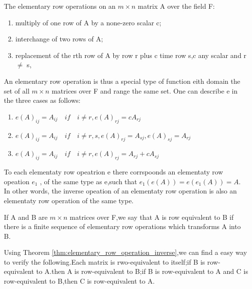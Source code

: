 The elementary row operations on an $m \times n$ matrix A over the field F:
\begin{enumerate}
	\item multiply of one row of A by a none-zero scalar c;
	\item interchange of two rows of A;
	\item replacement of the rth row of A by row r plus c time row s,c any scalar and r $\neq$ s,
\end{enumerate}

An elementary row operation is thus a special type of function eith domain the set of all $m \times n$ matrices over F and range the same set.
One can describe e in the three cases as follows:
\begin{enumerate}
	\item $e(A)_{ij} = A_{ij} \quad if \quad  i \neq r ,e(A)_{rj} = cA_{rj}$
	\item $e(A)_{ij} = A_{ij} \quad if \quad  i \neq r,s ,e(A)_{rj} = A_{sj},e(A)_{sj} = A_{rj}$
	\item $e(A)_{ij} = A_{ij} \quad if \quad  i \neq r ,e(A)_{rj} = A_{rj}+cA_{sj}$
	      \label{eq:elementary_row_operations describe}
\end{enumerate}

\begin{theorem}
	To each elementaty row opeatrion e there corrspoonds an elementaty row opeation $e_1$ , of the
	same type as e,such that $e_1(e(A)) = e(e_1(A)) = A$. In other words, the inverse opeation  of an elementaty row operation is also an elementaty row operation of the same type.
	\label{thm:elementary_row_operation_inverse}
\end{theorem}

\begin{definition}
	If A and B are $m \times n$ matrices over F,we say that A is row equivalent to B if there is a finite sequence of elementary row operations which transforms A into B.
\end{definition}
\begin{remark}
	Using Theorem \ref{thm:elementary_row_operation_inverse},we can find a easy way to verify the following.Each matrix is rwo-equivalent to itself;if B is row-equivalent to A.then A is row-equivalent to B;if B is row-equivalent to A and C is row-equivalent to B,then C is row-equivalent to A.

\end{remark}


